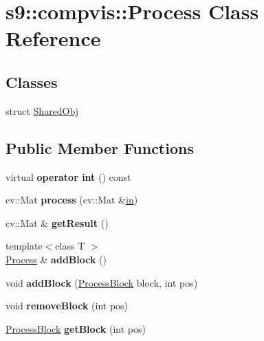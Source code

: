 \hypertarget{classs9_1_1compvis_1_1Process}{\section{s9\-:\-:compvis\-:\-:\-Process \-Class \-Reference}
\label{classs9_1_1compvis_1_1Process}
}
\subsection*{\-Classes}
\begin{DoxyCompactItemize}
\item 
struct \hyperlink{structs9_1_1compvis_1_1Process_1_1SharedObj}{\-Shared\-Obj}
\end{DoxyCompactItemize}
\subsection*{\-Public \-Member \-Functions}
\begin{DoxyCompactItemize}
\item 
\hypertarget{classs9_1_1compvis_1_1Process_a95bedc8cef212cd12c5d4dfbf68026b8}{virtual {\bfseries operator int} () const }\label{classs9_1_1compvis_1_1Process_a95bedc8cef212cd12c5d4dfbf68026b8}

\item 
\hypertarget{classs9_1_1compvis_1_1Process_a96f6cf110357fa65d344079744598a9e}{cv\-::\-Mat {\bfseries process} (cv\-::\-Mat \&\hyperlink{structin}{in})}\label{classs9_1_1compvis_1_1Process_a96f6cf110357fa65d344079744598a9e}

\item 
\hypertarget{classs9_1_1compvis_1_1Process_a79625b1be630b1447390cd62e07cfe62}{cv\-::\-Mat \& {\bfseries get\-Result} ()}\label{classs9_1_1compvis_1_1Process_a79625b1be630b1447390cd62e07cfe62}

\item 
\hypertarget{classs9_1_1compvis_1_1Process_ab729de1f8ea74ec662692d9e9e369e03}{{\footnotesize template$<$class T $>$ }\\\hyperlink{classs9_1_1compvis_1_1Process}{\-Process} \& {\bfseries add\-Block} ()}\label{classs9_1_1compvis_1_1Process_ab729de1f8ea74ec662692d9e9e369e03}

\item 
\hypertarget{classs9_1_1compvis_1_1Process_a238d5278ffd8749ea31621edc14593ae}{void {\bfseries add\-Block} (\hyperlink{classs9_1_1compvis_1_1ProcessBlock}{\-Process\-Block} block, int pos)}\label{classs9_1_1compvis_1_1Process_a238d5278ffd8749ea31621edc14593ae}

\item 
\hypertarget{classs9_1_1compvis_1_1Process_a2c8222a1f0005a540abe4fa841fa97ed}{void {\bfseries remove\-Block} (int pos)}\label{classs9_1_1compvis_1_1Process_a2c8222a1f0005a540abe4fa841fa97ed}

\item 
\hypertarget{classs9_1_1compvis_1_1Process_a9df4c25c176e8f77e5af15ab6c6e7c6b}{\hyperlink{classs9_1_1compvis_1_1ProcessBlock}{\-Process\-Block} {\bfseries get\-Block} (int pos)}\label{classs9_1_1compvis_1_1Process_a9df4c25c176e8f77e5af15ab6c6e7c6b}

\end{DoxyCompactItemize}
